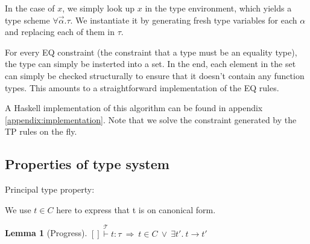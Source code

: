 \documentclass[a4paper]{article}
\newcommand{\im}{\Rightarrow}
\newcommand{\step}{\to}
\newcommand{\T}{\mathcal{T}}
\newcommand{\stackover}[2]{\stackrel{{#2}}{#1}}
\newtheorem{lemma}{Lemma}[section]
\begin{document}
In the case of $x$, we simply look up $x$ in the type environment,
which yields a type scheme $\forall \vec{\alpha}.\tau$. We
instantiate it by generating fresh type variables for each $\alpha$
and replacing each of them in $\tau$.

For every EQ constraint (the constraint that a type must be an
equality type), the type can simply be insterted into a set.
In the end, each element in the set can simply be checked
structurally to ensure that it doesn't contain any function types.
This amounts to a straightforward implementation of the EQ rules.

A Haskell implementation of this algorithm can be found in appendix
\ref{appendix:implementation}. Note that we solve the constraint
generated by the TP rules on the fly.

\subsection{Properties of type system}
\label{syntacticProperties}

Principal type property:

We use $t \in C$ here to express that t is on canonical form.

\begin{lemma}[Progress]
\label{lemma:progress}
$\stackover{[]\vdash t:\tau}{\T}\ \im\ t \in C\  \lor\  \exists t'.\ t\step t'$
\end{lemma}
\end{document}
